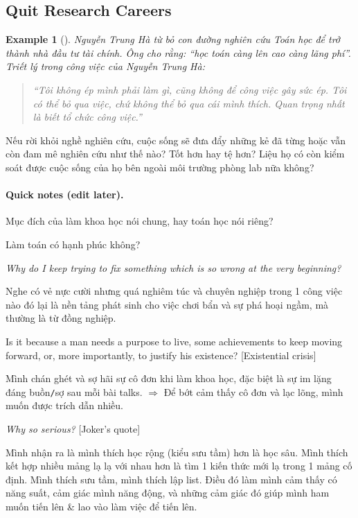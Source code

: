 \documentclass{article}
\numberwithin{equation}{section}
\newtheorem{example}{Example}[section]
\begin{document}
\subsection{Quit Research Careers}

\begin{example}[\cite{VNE/NTH}]
	Nguyễn Trung Hà từ bỏ con đường nghiên cứu Toán học để trở thành nhà đầu tư tài chính. Ông cho rằng: ``học toán càng lên cao càng lãng phí''. Triết lý trong công việc của Nguyễn Trung Hà:
	\begin{quotation}
		``Tôi không ép mình phải làm gì, cũng không để công việc gây sức ép. Tôi có thể bỏ qua việc, chứ không thể bỏ qua cái mình thích. Quan trọng nhất là biết tổ chức công việc.''
	\end{quotation}
	
\end{example}
Nếu rời khỏi nghề nghiên cứu, cuộc sống sẽ đưa đẩy những kẻ đã từng hoặc vẫn còn đam mê nghiên cứu như thế nào? Tốt hơn hay tệ hơn? Liệu họ có còn kiểm soát được cuộc sống của họ bên ngoài môi trường phòng lab nữa không?


\paragraph{Quick notes (edit later).}
Mục đích của làm khoa học nói chung, hay toán học nói riêng?

Làm toán có hạnh phúc không?

\textit{Why do I keep trying to fix something which is so wrong at the very beginning?}

Nghe có vẻ nực cười nhưng quá nghiêm túc và chuyên nghiệp trong 1 công việc nào đó lại là nền tảng phát sinh cho việc chơi bẩn và sự phá hoại ngầm, mà thường là từ đồng nghiệp.

Is it because a man needs a purpose to live, some achievements to keep moving forward, or, more importantly, to justify his existence? [Existential crisis]

Mình chán ghét và sợ hãi sự cô đơn khi làm khoa học, đặc biệt là sự im lặng đáng buồn\texttt{/}sợ sau mỗi bài talks. $\Rightarrow$ Để bớt cảm thấy cô đơn và lạc lõng, mình muốn được trích dẫn nhiều.

\textit{Why so serious?} [Joker's quote]

Mình nhận ra là mình thích học rộng (kiểu sưu tầm) hơn là học sâu. Mình thích kết hợp nhiều mảng lạ lạ với nhau hơn là tìm 1 kiến thức mới lạ trong 1 mảng cố định. Mình thích sưu tầm, mình thích lập list. Điều đó làm mình cảm thấy có năng suất, cảm giác mình năng động, và những cảm giác đó giúp mình ham muốn tiến lên \& lao vào làm việc để tiến lên.
\end{document}

